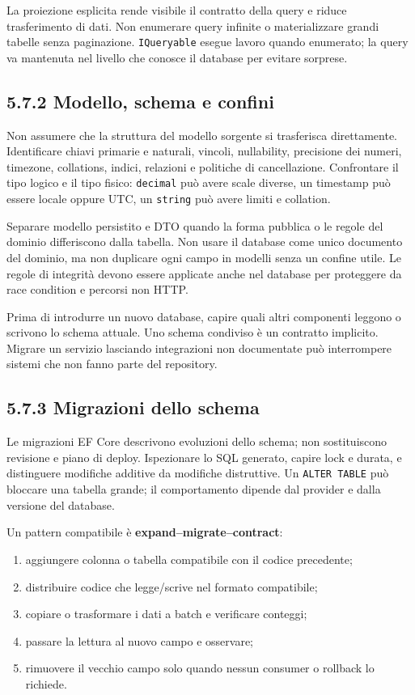 \documentclass[
  italian,
  10pt,
]{book}
\providecommand{\tightlist}{%
  \setlength{\itemsep}{0pt}\setlength{\parskip}{0pt}}
\begin{document}
La proiezione esplicita rende visibile il contratto della query e riduce
trasferimento di dati. Non enumerare query infinite o materializzare
grandi tabelle senza paginazione. \texttt{IQueryable} esegue lavoro
quando enumerato; la query va mantenuta nel livello che conosce il
database per evitare sorprese.

\subsection{5.7.2 Modello, schema e
confini}\label{modello-schema-e-confini}

Non assumere che la struttura del modello sorgente si trasferisca
direttamente. Identificare chiavi primarie e naturali, vincoli,
nullability, precisione dei numeri, timezone, collations, indici,
relazioni e politiche di cancellazione. Confrontare il tipo logico e il
tipo fisico: \texttt{decimal} può avere scale diverse, un timestamp può
essere locale oppure UTC, un \texttt{string} può avere limiti e
collation.

Separare modello persistito e DTO quando la forma pubblica o le regole
del dominio differiscono dalla tabella. Non usare il database come unico
documento del dominio, ma non duplicare ogni campo in modelli senza un
confine utile. Le regole di integrità devono essere applicate anche nel
database per proteggere da race condition e percorsi non HTTP.

Prima di introdurre un nuovo database, capire quali altri componenti
leggono o scrivono lo schema attuale. Uno schema condiviso è un
contratto implicito. Migrare un servizio lasciando integrazioni non
documentate può interrompere sistemi che non fanno parte del repository.

\subsection{5.7.3 Migrazioni dello
schema}\label{migrazioni-dello-schema}

Le migrazioni EF Core descrivono evoluzioni dello schema; non
sostituiscono revisione e piano di deploy. Ispezionare lo SQL generato,
capire lock e durata, e distinguere modifiche additive da modifiche
distruttive. Un \texttt{ALTER\ TABLE} può bloccare una tabella grande;
il comportamento dipende dal provider e dalla versione del database.

Un pattern compatibile è \textbf{expand--migrate--contract}:

\begin{enumerate}
\def\labelenumi{\arabic{enumi}.}
\tightlist
\item
  aggiungere colonna o tabella compatibile con il codice precedente;
\item
  distribuire codice che legge/scrive nel formato compatibile;
\item
  copiare o trasformare i dati a batch e verificare conteggi;
\item
  passare la lettura al nuovo campo e osservare;
\item
  rimuovere il vecchio campo solo quando nessun consumer o rollback lo
  richiede.
\end{enumerate}
\end{document}
